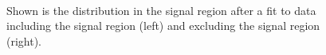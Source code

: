 \begin{figure}
\centering
  \\
\caption{Shown is the \MET distribution in the signal region after a fit to data including the signal region (left) and excluding the signal region (right).}
\label{Fig_cr_Recoil_fail}
\end{figure}

